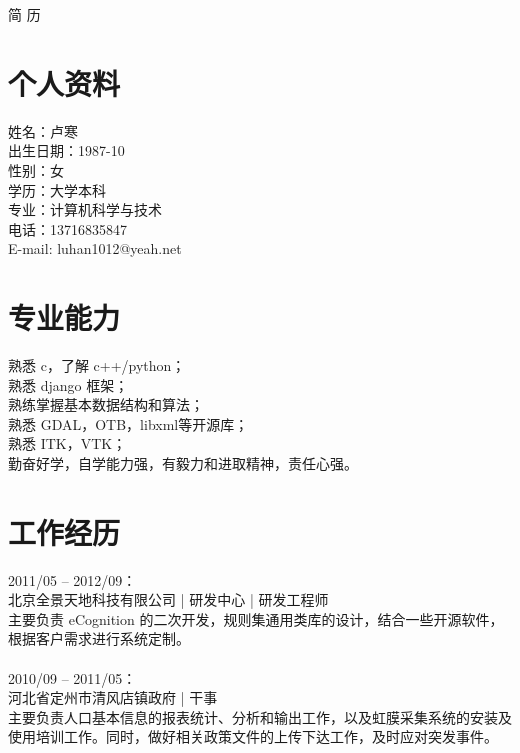 \documentclass[11pt, a4paper]{article}
\begin{document}
\begin{center}
    \Huge{简{ }{ }历}       %
\end{center}





\section*{个人资料}         %

姓名：卢寒 \\
出生日期：1987-10 \\
性别：女 \\
学历：大学本科 \\
专业：计算机科学与技术 \\
电话：\mbox{13716835847} \\
E-mail: luhan1012@yeah.net \\





\section*{专业能力}

熟悉 c，了解 c++/python； \\
熟悉 django 框架； \\
熟练掌握基本数据结构和算法； \\
熟悉 GDAL，OTB，libxml等开源库； \\
熟悉 ITK，VTK； \\
勤奋好学，自学能力强，有毅力和进取精神，责任心强。 \\






\section*{工作经历}

2011/05 -- 2012/09： \\
北京全景天地科技有限公司 | 研发中心 | 研发工程师 \\
主要负责 eCognition 的二次开发，规则集通用类库的设计，结合一些开源软件，根据客户需求进行系统定制。 \\
\\
2010/09 -- 2011/05： \\
河北省定州市清风店镇政府 | 干事 \\
主要负责人口基本信息的报表统计、分析和输出工作，以及虹膜采集系统的安装及使用培训工作。同时，做好相关政策文件的上传下达工作，及时应对突发事件。 \\
\end{document}
